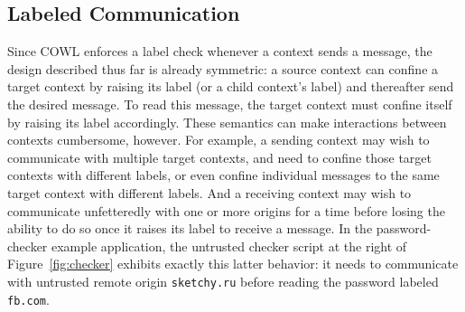 \subsection{Labeled Communication}
\label{sec:system:communication}
Since COWL enforces a label check whenever a context sends a message,
the design described thus far is already symmetric: a source context
can confine a target context by raising its label (or a child
context's label) and thereafter send the desired message. To read this
message, the target context must confine itself by raising its label
accordingly. These semantics can make interactions between contexts
cumbersome, however. For example, a sending context may wish to
communicate with multiple target contexts, and need to confine those
target contexts with different labels, or even confine individual
messages to the same target context with different labels. And a
receiving context may wish to communicate unfetteredly with one or
more origins for a time before losing the ability to do so once it
raises its label to receive a message. In the password-checker example
application, the untrusted checker script at the right of
Figure~\ref{fig:checker} exhibits exactly this latter behavior: it
needs to communicate with untrusted remote origin {\tt sketchy.ru}
before reading the password labeled {\tt fb.com}.


